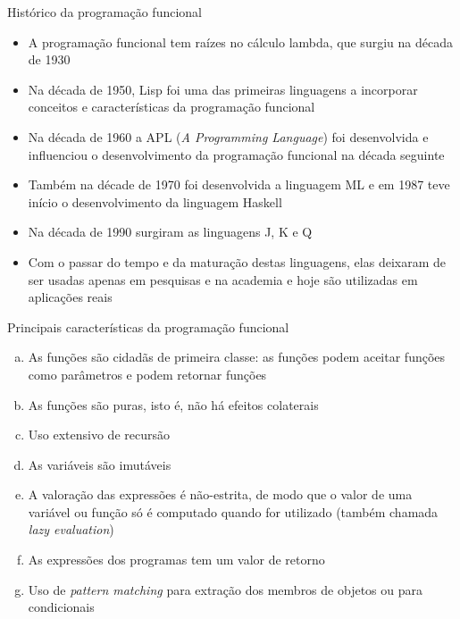 \begin{frame}[fragile]{Histórico da programação funcional}

    \begin{itemize}
        \item A programação funcional tem raízes no cálculo lambda, que surgiu na década de 1930

        \item Na década de 1950, Lisp foi uma das primeiras linguagens a incorporar conceitos e
            características da programação funcional

        \item Na década de 1960 a APL (\textit{A Programming Language}) foi desenvolvida e 
            influenciou o desenvolvimento da programação funcional na década seguinte

        \item Também na décade de 1970 foi desenvolvida a linguagem ML e em 1987 teve início o
            desenvolvimento da linguagem Haskell

        \item Na década de 1990 surgiram as linguagens J, K e Q

        \item Com o passar do tempo e da maturação destas linguagens, elas deixaram de ser usadas
            apenas em pesquisas e na academia e hoje são utilizadas em aplicações reais
    \end{itemize}

\end{frame}

\begin{frame}[fragile]{Principais características da programação funcional}

    \begin{enumerate}[(a)]
        \item As funções são cidadãs de primeira classe: as funções podem aceitar funções
            como parâmetros e podem retornar funções

        \item As funções são puras, isto é, não há efeitos colaterais

        \item Uso extensivo de recursão

        \item As variáveis são imutáveis

        \item A valoração das expressões é não-estrita, de modo que o valor de uma variável ou
            função só é computado quando for utilizado (também chamada \textit{lazy evaluation})

        \item As expressões dos programas tem um valor de retorno 

        \item Uso de \textit{pattern matching} para extração dos membros de objetos ou para
            condicionais
    \end{enumerate}

\end{frame}

